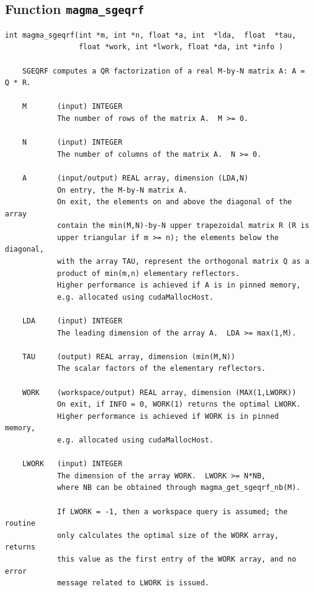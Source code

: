 \documentclass[10pt]{book}
\begin{document}
\newpage
\subsection{Function {\tt {\bf magma\_sgeqrf}}}
\begin{verbatim}
int magma_sgeqrf(int *m, int *n, float *a, int  *lda,  float  *tau,
                 float *work, int *lwork, float *da, int *info )
   
    SGEQRF computes a QR factorization of a real M-by-N matrix A: A = Q * R.   

    M       (input) INTEGER   
            The number of rows of the matrix A.  M >= 0.   

    N       (input) INTEGER   
            The number of columns of the matrix A.  N >= 0.   

    A       (input/output) REAL array, dimension (LDA,N)   
            On entry, the M-by-N matrix A.   
            On exit, the elements on and above the diagonal of the array   
            contain the min(M,N)-by-N upper trapezoidal matrix R (R is   
            upper triangular if m >= n); the elements below the diagonal,   
            with the array TAU, represent the orthogonal matrix Q as a   
            product of min(m,n) elementary reflectors.   
            Higher performance is achieved if A is in pinned memory, 
            e.g. allocated using cudaMallocHost.

    LDA     (input) INTEGER   
            The leading dimension of the array A.  LDA >= max(1,M).   

    TAU     (output) REAL array, dimension (min(M,N))   
            The scalar factors of the elementary reflectors.   

    WORK    (workspace/output) REAL array, dimension (MAX(1,LWORK))   
            On exit, if INFO = 0, WORK(1) returns the optimal LWORK.   
            Higher performance is achieved if WORK is in pinned memory, 
            e.g. allocated using cudaMallocHost.

    LWORK   (input) INTEGER   
            The dimension of the array WORK.  LWORK >= N*NB, 
            where NB can be obtained through magma_get_sgeqrf_nb(M).   

            If LWORK = -1, then a workspace query is assumed; the routine   
            only calculates the optimal size of the WORK array, returns   
            this value as the first entry of the WORK array, and no error   
            message related to LWORK is issued.


\end{verbatim}
\end{document}
